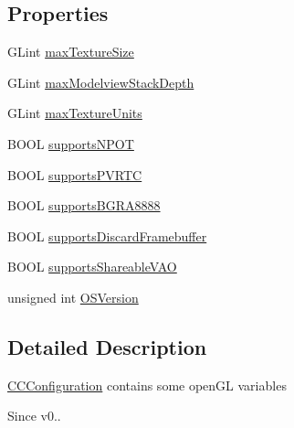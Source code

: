 \subsection*{Properties}
\begin{DoxyCompactItemize}
\item 
G\-Lint \hyperlink{interface_c_c_configuration_a247ddc51eeee101083716888f52c1ccb}{max\-Texture\-Size}
\item 
G\-Lint \hyperlink{interface_c_c_configuration_a7c7b06ab48d5f5e55aff3681aa77ab91}{max\-Modelview\-Stack\-Depth}
\item 
G\-Lint \hyperlink{interface_c_c_configuration_a1fab22b6a96c7b4b85e120df26291612}{max\-Texture\-Units}
\item 
B\-O\-O\-L \hyperlink{interface_c_c_configuration_a9de282307e774c7274bead01371c242e}{supports\-N\-P\-O\-T}
\item 
B\-O\-O\-L \hyperlink{interface_c_c_configuration_a2d9f6433a251a61dfb1b120aed830840}{supports\-P\-V\-R\-T\-C}
\item 
B\-O\-O\-L \hyperlink{interface_c_c_configuration_a7bf4ed17273b9cf0e24333444bf03bb9}{supports\-B\-G\-R\-A8888}
\item 
B\-O\-O\-L \hyperlink{interface_c_c_configuration_a458fe46160b0950264f13aecd60ecf60}{supports\-Discard\-Framebuffer}
\item 
B\-O\-O\-L \hyperlink{interface_c_c_configuration_a9f955f4b66edfc2391c08df18cddad62}{supports\-Shareable\-V\-A\-O}
\item 
unsigned int \hyperlink{interface_c_c_configuration_a702f8067990021f6ad4366c8ea8033f4}{O\-S\-Version}
\end{DoxyCompactItemize}


\subsection{Detailed Description}
\hyperlink{interface_c_c_configuration}{C\-C\-Configuration} contains some open\-G\-L variables \begin{DoxySince}{Since}
v0.. 
\end{DoxySince}


